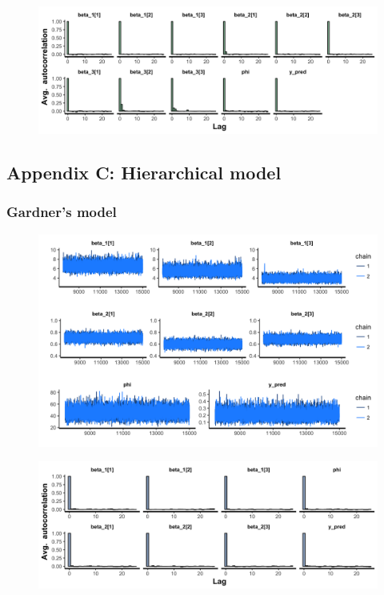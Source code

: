 \documentclass{article}
\begin{document}
\begin{figure}[ht!]
\centering
\includegraphics[width=16cm]{indep_3pars_ac.png}
\end{figure}

\newpage
\subsection*{Appendix C: Hierarchical model}
\subsubsection*{\textbf{Gardner's model}}
\begin{figure}[ht!]
\centering
\includegraphics[width=16cm]{hier_2pars_trace.png}
\end{figure}

\begin{figure}[ht!]
\centering
\includegraphics[width=16cm]{hier_2pars_ac.png}
\end{figure}
\end{document}
